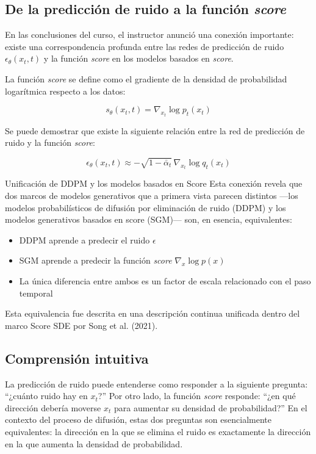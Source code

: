 \documentclass[a4paper]{article}
\begin{document}
\subsection{De la predicción de ruido a la función \textit{score}}

En las conclusiones del curso, el instructor anunció una conexión importante: existe una correspondencia profunda entre las redes de predicción de ruido $\epsilon_\theta(x_t, t)$ y la función \textit{score} en los modelos basados en \textit{score}.

La función \textit{score} se define como el gradiente de la densidad de probabilidad logarítmica respecto a los datos:

$$s_\theta(x_t, t) = \nabla_{x_t} \log p_t(x_t)$$

Se puede demostrar que existe la siguiente relación entre la red de predicción de ruido y la función \textit{score}:

$$\epsilon_\theta(x_t, t) \approx -\sqrt{1 - \bar{\alpha}_t}\, \nabla_{x_t} \log q_t(x_t)$$

\begin{knowledgebox}{Unificación de DDPM y los modelos basados en Score}
Esta conexión revela que dos marcos de modelos generativos que a primera vista parecen distintos —los modelos probabilísticos de difusión por eliminación de ruido (DDPM) y los modelos generativos basados en score (SGM)— son, en esencia, equivalentes:
\begin{itemize}
    \item DDPM aprende a predecir el ruido $\epsilon$
    \item SGM aprende a predecir la función \textit{score} $\nabla_x \log p(x)$
    \item La única diferencia entre ambos es un factor de escala relacionado con el paso temporal
\end{itemize}
Esta equivalencia fue descrita en una descripción continua unificada dentro del marco Score SDE por Song et al. (2021).
\end{knowledgebox}

\subsection{Comprensión intuitiva}

La predicción de ruido puede entenderse como responder a la siguiente pregunta: ``¿cuánto ruido hay en $x_t$?'' Por otro lado, la función \textit{score} responde: ``¿en qué dirección debería moverse $x_t$ para aumentar su densidad de probabilidad?'' En el contexto del proceso de difusión, estas dos preguntas son esencialmente equivalentes: la dirección en la que se elimina el ruido es exactamente la dirección en la que aumenta la densidad de probabilidad.
\end{document}
